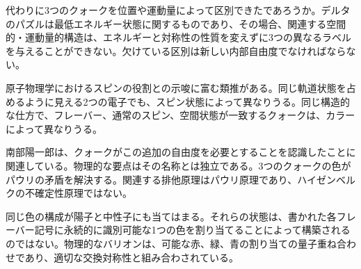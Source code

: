 代わりに3つのクォークを位置や運動量によって区別できたであろうか。デルタのパズルは最低エネルギー状態に関するものであり、その場合、関連する空間的・運動量的構造は、エネルギーと対称性の性質を変えずに3つの異なるラベルを与えることができない。欠けている区別は新しい内部自由度でなければならない。

原子物理学におけるスピンの役割との示唆に富む類推がある。同じ軌道状態を占めるように見える2つの電子でも、スピン状態によって異なりうる。同じ構造的な仕方で、フレーバー、通常のスピン、空間状態が一致するクォークは、カラーによって異なりうる。


南部陽一郎は、クォークがこの追加の自由度を必要とすることを認識したことに関連している。物理的な要点はその名称とは独立である。3つのクォークの色がパウリの矛盾を解決する。関連する排他原理はパウリ原理であり、ハイゼンベルクの不確定性原理ではない。


同じ色の構成が陽子と中性子にも当てはまる。それらの状態は、書かれた各フレーバー記号に永続的に識別可能な1つの色を割り当てることによって構築されるのではない。物理的なバリオンは、可能な赤、緑、青の割り当ての量子重ね合わせであり、適切な交換対称性と組み合わされている。

\begin{classroomqa}
\end{classroomqa}

\begin{classroomqa}
\end{classroomqa}

